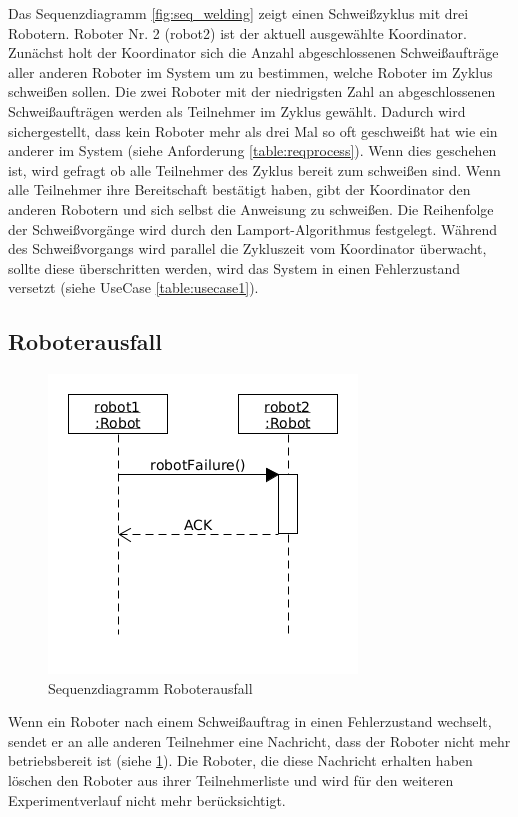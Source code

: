 Das Sequenzdiagramm \ref{fig:seq_welding} zeigt einen Schweißzyklus mit drei Robotern. Roboter Nr. 2 (robot2)
ist der aktuell ausgewählte Koordinator.
Zunächst holt der Koordinator sich die Anzahl abgeschlossenen Schweißaufträge aller anderen Roboter im System
um zu bestimmen, welche Roboter im Zyklus schweißen sollen. Die zwei Roboter mit der niedrigsten Zahl
an abgeschlossenen Schweißaufträgen werden als Teilnehmer im Zyklus gewählt. Dadurch wird sichergestellt,
dass kein Roboter mehr als drei Mal so oft geschweißt hat wie ein anderer im System (siehe Anforderung
\ref{table:reqprocess}).
 Wenn dies geschehen ist, wird gefragt ob alle Teilnehmer des Zyklus bereit zum schweißen sind. 
Wenn alle Teilnehmer ihre Bereitschaft bestätigt haben, gibt der Koordinator den anderen Robotern
und sich selbst die Anweisung zu schweißen. Die Reihenfolge der Schweißvorgänge wird durch den 
Lamport-Algorithmus festgelegt. Während des Schweißvorgangs wird parallel die Zykluszeit vom 
Koordinator überwacht, sollte diese überschritten werden, wird das System in einen Fehlerzustand 
versetzt (siehe UseCase \ref{table:usecase1}).

\clearpage

\subsection{Roboterausfall}

\begin{figure}[h]
 \begin{center}
 \includegraphics[scale=1]{../diagrams/11_sequence_robot_fail.png}
 \end{center}
 \caption{Sequenzdiagramm Roboterausfall}
 \label{fig:seq_failure}
\end{figure}

Wenn ein Roboter nach einem Schweißauftrag in einen Fehlerzustand wechselt, sendet er an alle anderen
Teilnehmer eine Nachricht, dass der Roboter nicht mehr betriebsbereit ist (siehe \ref{fig:seq_failure}).
Die Roboter, die diese Nachricht erhalten haben löschen den Roboter aus ihrer Teilnehmerliste und wird
für den weiteren Experimentverlauf nicht mehr berücksichtigt.
